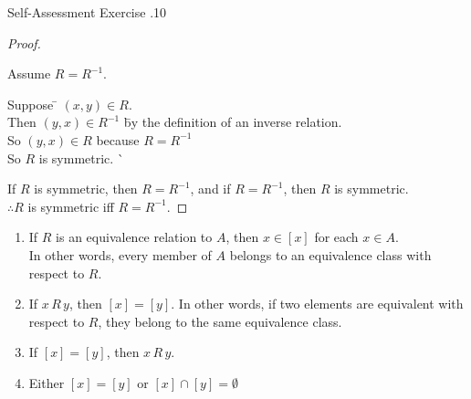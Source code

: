 \documentclass[../notes.tex]{subfiles}
\begin{document}
\begin{exercise}{Self-Assessment Exercise \thechapter.10}
\begin{enumerate}
\begin{proof}
\begin{enumerate}[label=(\roman*)]
										\begin{subproof}
											Assume $R = R^{-1}$.
											\begin{tabbing}
												Suppose \quad \= $(x, y) \in R$.\\
												Then \>$(y, x) \in R^{-1}$ \quad \= by the definition of an inverse relation.\\
												So \>$(y, x) \in R$ \> because $R = R^{-1}$\\
												So \> $R$ is symmetric. \` \qedhere
											\end{tabbing}
										\end{subproof}
								\end{enumerate}
								If $R$ is symmetric, then $R = R^{-1}$, and if $R = R^{-1}$, then $R$ is symmetric.\\
								$\therefore R$ is symmetric iff $R = R^{-1}$.
							\end{proof}
					\end{enumerate}
				\end{exercise}
				\pagebreak
				\begin{theorem}
					\begin{enumerate}[label=(\roman*)]
						\item If $R$ is an equivalence relation to $A$, then $x \in [x]$ for each $x \in A$.\\
							In other words, every member of $A$ belongs to an equivalence class with respect to $R$.
						\item If $x\, R \, y$, then $[x] = [y]$. In other words, if two elements are equivalent with respect to $R$, they belong to the same equivalence class.
						\item If $[x] = [y]$, then $x \, R \, y$.
						\item Either $[x] = [y]$ or $[x] \cap [y] = \emptyset$
					\end{enumerate}
				\end{theorem}
\end{document}
